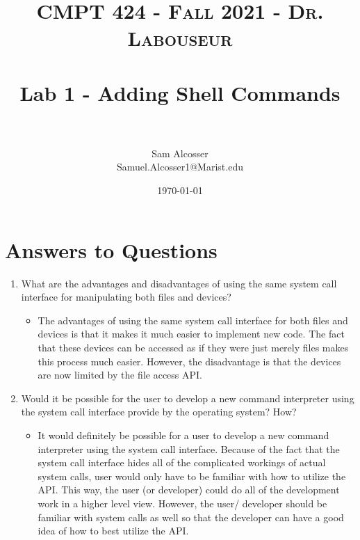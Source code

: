 \documentclass[letterpaper, 10pt]{article}
\title{	
   \normalfont \normalsize 
   \textsc{CMPT 424 - Fall 2021 - Dr. Labouseur} \\[10pt] %
   \horrule{0.5pt} \\[0.25cm] 	%
   \huge Lab 1 - Adding Shell Commands \\     	    %
   \horrule{0.5pt} \\[0.25cm] 	%
}
\author{Sam Alcosser \\ \normalsize Samuel.Alcosser1@Marist.edu}
\date{\normalsize\today} 	%
\begin{document}
\maketitle %



\section{Answers to Questions}
\begin{enumerate}
    \item What are the advantages and disadvantages of using the same system call interface 
for manipulating both files and devices?
    \begin{itemize}
        \item The advantages of using the same system call interface for both files and devices is that it makes it much easier to implement new code. The fact that these devices can be accessed as if they were just merely files makes this process much easier. However, the disadvantage is that the devices are now limited by the file access API.
    \end{itemize}
    \item Would it be possible for the user to develop a new command interpreter using the 
system call interface provide by the operating system? How?
\begin{itemize}
        \item It would definitely be possible for a user to develop a new command interpreter using the system call interface. Because of the fact that the system call interface hides all of the complicated workings of actual system calls, user would only have to be familiar with how to utilize the API. This way, the user (or developer) could do all of the development work in a higher level view. However, the user/ developer should be familiar with system calls as well so that the developer can have a good idea of how to best utilize the API.
\end{itemize}
\end{enumerate}
\end{document}
